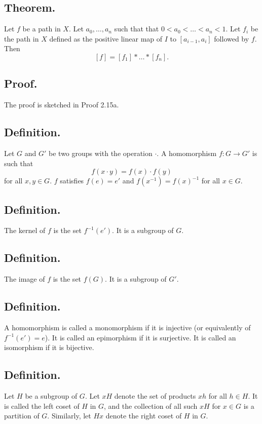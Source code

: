 \documentclass[titlepage]{article}
\begin{document}
\subsection{Theorem.} Let $f$ be a path in $X$. Let $a_{0}, \ldots, a_{n}$ such that that $0 < a_{0} < \ldots < a_{n} < 1$. Let $f_{i}$ be the path in $X$ defined as the positive linear map of $I$ to $[a_{i-1}, a_{i}]$ followed by $f$. Then 
$$[f] = [f_{1}] * \ldots * [f_{n}].$$

\subsection{Proof.} The proof is sketched in Proof 2.15a.

\subsection{Definition.} Let $G$ and $G'$ be two groups with the operation $\cdot$. A homomorphism $f: G \to G'$ is such that 
$$f(x \cdot y) = f(x) \cdot f(y)$$
for all $x, y \in G$. $f$ satisfies $f(e) = e'$ and $f(x^{-1}) = f(x)^{-1}$ for all $x \in G$.

\subsection{Definition.} The kernel of $f$ is the set $f^{-1}(e')$. It is a subgroup of $G$.

\subsection{Definition.} The image of $f$ is the set $f(G)$. It is a subgroup of $G'$.

\subsection{Definition.} A homomorphism is called a monomorphism if it is injective (or equivalently of $f^{-1}(e') = e$). It is called an epimorphism if it is surjective. It is called an isomorphism if it is bijective.

\subsection{Definition.} Let $H$ be a subgroup of $G$. Let $xH$ denote the set of products $xh$ for all $h \in H$. It is called the left coset of $H$ in $G$, and the collection of all such $xH$ for $x \in G$ is a partition of $G$. Similarly, let $Hx$ denote the right coset of $H$ in $G$.
\end{document}
